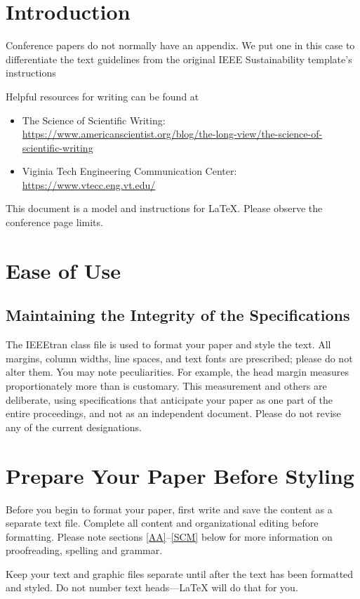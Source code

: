 \documentclass[conference,a4paper]{IEEEtran}
\begin{document}
\appendix
\section{Introduction}
Conference papers do not normally have an appendix.
We put one in this case to differentiate the text guidelines from the original IEEE Sustainability template's instructions

Helpful resources for writing can be found at
\begin{itemize}
\item The Science of Scientific Writing:  \url{https://www.americanscientist.org/blog/the-long-view/the-science-of-scientific-writing}
\item Viginia Tech Engineering Communication Center: \url{https://www.vtecc.eng.vt.edu/
}
\end{itemize}


This document is a model and instructions for \LaTeX.
Please observe the conference page limits. 

\section{Ease of Use}

\subsection{Maintaining the Integrity of the Specifications}

The IEEEtran class file is used to format your paper and style the text. All margins, 
column widths, line spaces, and text fonts are prescribed; please do not 
alter them. You may note peculiarities. For example, the head margin
measures proportionately more than is customary. This measurement 
and others are deliberate, using specifications that anticipate your paper 
as one part of the entire proceedings, and not as an independent document. 
Please do not revise any of the current designations.

\section{Prepare Your Paper Before Styling}
Before you begin to format your paper, first write and save the content as a 
separate text file. Complete all content and organizational editing before 
formatting. Please note sections \ref{AA}--\ref{SCM} below for more information on 
proofreading, spelling and grammar.

Keep your text and graphic files separate until after the text has been 
formatted and styled. Do not number text heads---{\LaTeX} will do that 
for you.
\end{document}

